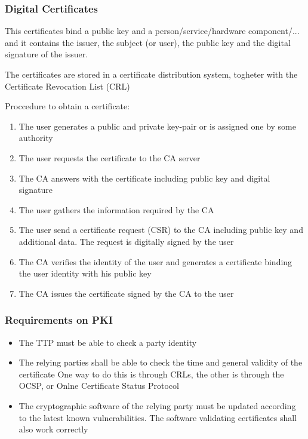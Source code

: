 \documentclass[12pt, a4paper]{article}
\begin{document}
\subsubsection{Digital Certificates}
This certificates bind a public key and a person/service/hardware component/... and it contains the issuer, the 
subject (or user), the public key and the digital signature of the issuer.

The certificates are stored in a certificate distribution system, togheter with the Certificate Revocation List
(CRL)

Proccedure to obtain a certificate:
\begin{enumerate}
    \item The user generates a public and private key-pair or is assigned one by some authority
    \item The user requests the certificate to the CA server
    \item The CA answers with the certificate including public key and digital signature
    \item The user gathers the information required by the CA
    \item The user send a certificate request (CSR) to the CA including public key and additional data. The
    request is digitally signed by the user 
    \item The CA verifies the identity of the user and generates a certificate binding the user identity with 
    his public key
    \item The CA issues the certificate signed by the CA to the user
\end{enumerate}

\subsubsection{Requirements on PKI}
\begin{itemize}
    \item The TTP must be able to check a party identity
    \item The relying parties shall be able to check the time and general validity of the certificate
    \subitem One way to do this is through CRLs, the other is through the OCSP, or 
    Onlne Certificate Status Protocol
    \item The cryptographic software of the relying party must be updated according to the latest known
    vulnerabilities. The software validating certificates shall also work correctly
\end{itemize}
\end{document}
